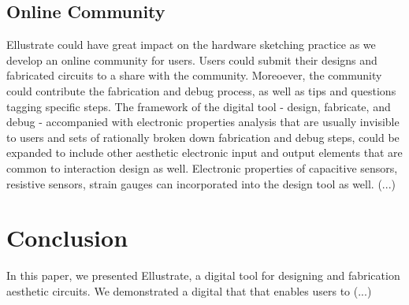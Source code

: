 \documentclass{sigchi}
\begin{document}
\subsection{Online Community}
Ellustrate could have great impact on the hardware sketching practice as we develop an online community for users. Users could submit their designs and fabricated circuits to a share with the community. Moreoever, the community could contribute the fabrication and debug process, as well as tips and questions tagging specific steps. The framework of the digital tool - design, fabricate, and debug - accompanied with electronic properties analysis that are usually invisible to users and sets of rationally broken down fabrication and debug steps, could be expanded to include other aesthetic electronic input and output elements that are common to interaction design as well. Electronic properties of capacitive sensors, resistive sensors, strain gauges can incorporated into the design tool as well. (...)

\section {Conclusion}
In this paper, we presented Ellustrate, a digital tool for designing and fabrication aesthetic circuits. We demonstrated a digital that that enables users to (...)


\balance



\end{document}
